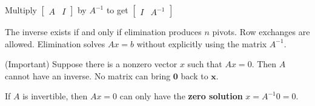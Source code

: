 \begin{center}
    Multiply $\displaystyle \left[\begin{matrix}
                A & I
            \end{matrix}\right]$ by $\displaystyle A^{-1}$ to get $\displaystyle \left[\begin{matrix}
                I & A^{-1}
            \end{matrix}\right]$
\end{center}

\begin{remark}
    The inverse exists if and only if elimination produces $n$ pivots. Row exchanges are allowed. Elimination solves $Ax = b$ without explicitly using the matrix $A^{-1}$.
\end{remark}

\begin{remark}
    (Important) Suppose there is a nonzero vector $ x $ such that $ A x=0 . $ Then $ A $ cannot have an inverse. No matrix can bring $ \mathbf{0} $ back to $ \boldsymbol{x} $.

If $ A $ is invertible, then $ A x=0 $ can only have the \textbf{zero solution} $ x=A^{-1} 0=0 $.
\end{remark}



